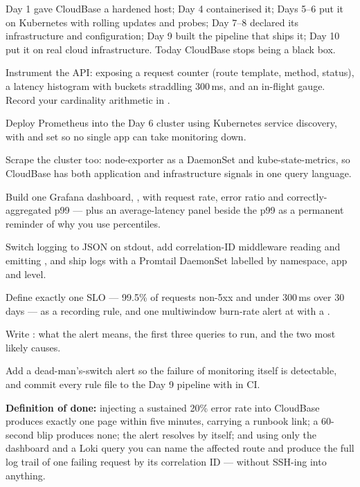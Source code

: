 Day 1 gave CloudBase a hardened host; Day 4 containerised it; Days 5--6 put it on Kubernetes with rolling updates and probes; Day 7--8 declared its infrastructure and configuration; Day 9 built the pipeline that ships it; Day 10 put it on real cloud infrastructure. Today CloudBase stops being a black box.

\begin{buildalong}
\begin{wbitem}
  \item Instrument the API:  exposing a request counter (route template, method, status), a latency histogram with buckets straddling 300\,ms, and an in-flight gauge. Record your cardinality arithmetic in .
  \item Deploy Prometheus into the Day 6 cluster using Kubernetes service discovery, with  and  set so no single app can take monitoring down.
  \item Scrape the cluster too: node-exporter as a DaemonSet and kube-state-metrics, so CloudBase has both application and infrastructure signals in one query language.
  \item Build one Grafana dashboard, , with request rate, error ratio and correctly-aggregated p99 --- plus an average-latency panel beside the p99 as a permanent reminder of why you use percentiles.
  \item Switch logging to JSON on stdout, add correlation-ID middleware reading and emitting , and ship logs with a Promtail DaemonSet labelled by namespace, app and level.
  \item Define exactly one SLO --- 99.5\% of requests non-5xx and under 300\,ms over 30 days --- as a recording rule, and one multiwindow burn-rate alert at  with a .
  \item Write : what the alert means, the first three queries to run, and the two most likely causes.
  \item Add a dead-man's-switch alert so the failure of monitoring itself is detectable, and commit every rule file to the Day 9 pipeline with  in CI.
\end{wbitem}
\smallskip\textbf{Definition of done:} injecting a sustained 20\% error rate into CloudBase produces exactly one page within five minutes, carrying a runbook link; a 60-second blip produces none; the alert resolves by itself; and using only the dashboard and a Loki query you can name the affected route and produce the full log trail of one failing request by its correlation ID --- without SSH-ing into anything.
\end{buildalong}

